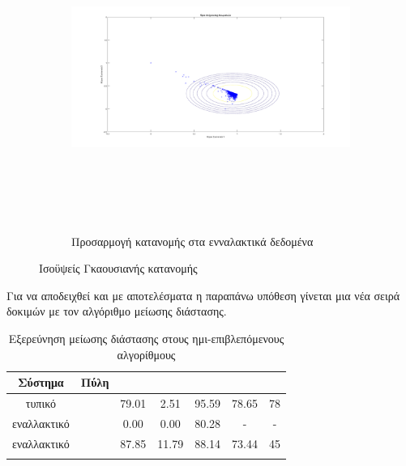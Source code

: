 \begin{figure}[ht!]
\begin{subfigure}[b]{0.4\textwidth}
\includegraphics[width=160mm, height=100mm]{../../plots/gr_threshold_semi_sup_2.png}
\caption{Προσαρμογή κατανομής στα ενναλακτικά δεδομένα}
\label{fig:threshanomalydetection2}
\end{subfigure}

\caption{Ισοϋψείς Γκαουσιανής κατανομής}
\label{fig:viewandthreshold}
\end{figure}

Για να αποδειχθεί και με αποτελέσματα η παραπάνω υπόθεση γίνεται μια νέα σειρά δοκιμών με τον αλγόριθμο μείωσης διάστασης.
\begin{center}
\begin{longtabu} to 0.8\textwidth {| c | c || c | c | c | c | c |   }
 \hline
 Σύστημα & Πύλη &  &  &  &  & \\
\hline
τυπικό& & 79.01 & 2.51 & 95.59 & 78.65 & 78\\
 \hline
 εναλλακτικό& & 0.00 & 0.00  & 80.28 &  - &  -\\ 
\hline
εναλλακτικό& & 87.85 & 11.79  & 88.14 & 73.44 & 45\\ 
 \hline
\caption{Εξερεύνηση μείωσης διάστασης στους ημι-επιβλεπόμενους αλγορίθμους}
\label{tab:testpcasemisup}
\end{longtabu}
\end{center}

